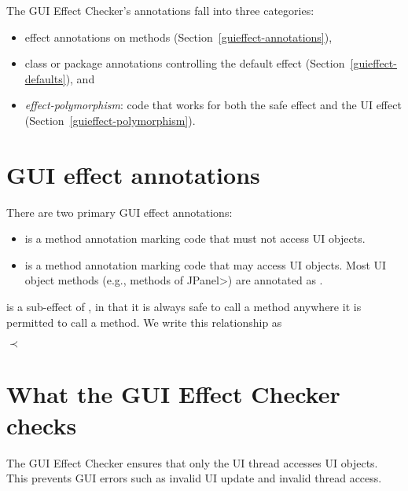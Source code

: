
The GUI Effect Checker's annotations fall into three categories:

\begin{itemize}
\item
  effect annotations on methods (Section~\ref{guieffect-annotations}),
\item
 class or package annotations controlling the default effect (Section~\ref{guieffect-defaults}), and
\item
  \emph{effect-polymorphism}:  code that works for both the safe effect and
  the UI effect (Section~\ref{guieffect-polymorphism}).
\end{itemize}


\section{GUI effect annotations\label{guieffect-annotations}}

There are two primary GUI effect annotations:
\begin{itemize}
\item
  is a method annotation marking code that must not
  access UI objects.
\item
  is a method annotation marking code that may access
  UI objects.  Most UI object methods (e.g., methods of \<JPanel>) are
  annotated as .
\end{itemize}

 is a sub-effect of , in that it is always safe to
call a  method anywhere it is permitted to call a
 method.  We write this relationship as

\centerline{ $\prec$ }


\section{What the GUI Effect Checker checks\label{guieffect-checks}}

The GUI Effect Checker ensures that only the UI thread accesses UI objects.
This prevents GUI errors such
as invalid UI update and invalid thread access.

